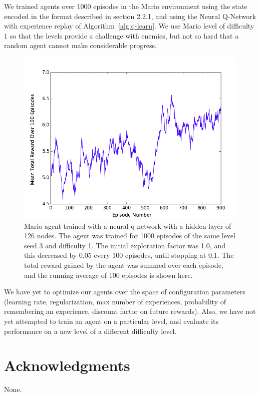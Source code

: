 \documentclass{article}
\begin{document}
We trained agents over 1000 episodes in the Mario environment using the state encoded in the format described in section 2.2.1, and using the Neural Q-Network with experience replay of Algorithm~\ref{alg:q-learn}. We use Mario level of difficulty 1 so that the levels provide a challenge with enemies, but not so hard that a random agent cannot make considerable progress.
 
 \begin{figure}
 \begin{center}
\includegraphics[scale=0.3]{progress_report.png}
\caption{Mario agent trained with a neural q-network with a hidden layer of 126 nodes. The agent was trained for 1000 episodes of the same level seed 3 and difficulty 1. The initial exploration factor was 1.0, and this decreased by 0.05 every 100 episodes, until stopping at 0.1. The total reward gained by the agent was summed over each episode, and the running average of 100 episodes is shown here.}
\end{center}
\end{figure}
  
 We have yet to optimize our agents over the space of configuration parameters (learning rate, regularization, max number of experiences, probability of remembering an experience, discount factor on future rewards). Also, we have not yet attempted to train an agent on a particular level, and evaluate its performance on a new level of a different difficulty level.
 
\section*{Acknowledgments} 
 
None.



\end{document}
